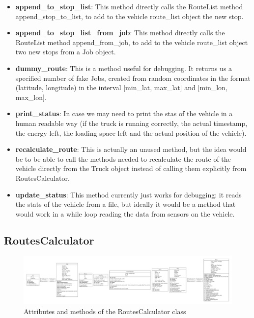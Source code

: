 \documentclass[titlepage]{article}
\begin{document}
\begin{itemize}
    \item \textbf{append\_to\_stop\_list}: This method directly calls the RouteList method append\_stop\_to\_list, to add to the vehicle route\_list object the new stop.
    \item \textbf{append\_to\_stop\_list\_from\_job}: This method directly calls the RouteList method append\_from\_job, to add to the vehicle route\_list object two new stops from a Job object.
    \item \textbf{dummy\_route}: This is a method useful for debugging. It returns us a specified number of fake Jobs, created from random coordinates in the format (latitude, longitude) in the interval [min\_lat, max\_lat] and [min\_lon, max\_lon].
    \item \textbf{print\_status}: In case we may need to print the stas of the vehicle in a human readable way (if the truck is running correctly, the actual timestamp, the energy left, the loading space left and the actual position of the vehicle).
    \item \textbf{recalculate\_route}: This is actually an unused method, but the idea would be to be able to call the methods needed to recalculate the route of the vehicle directly from the Truck object instead of calling them explicitly from RoutesCalculator.
    \item \textbf{update\_status}: This method currently just works for debugging: it reads the stats of the vehicle from a file, but ideally it would be a method that would work in a while loop reading the data from sensors on the vehicle.
\end{itemize}

\subsection{RoutesCalculator}
\begin{figure}[H]
    \centering
    \includegraphics[trim={40.1cm 6.9cm 38cm 6.9cm}, clip, scale=.5]{img/classes.pdf}
    \caption{Attributes and methods of the RoutesCalculator class}
    \label{fig:routescalculator_class}
\end{figure}
\end{document}
